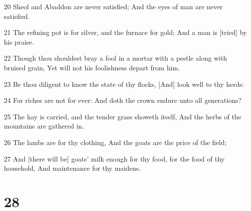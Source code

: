 \par 20 Sheol and Abaddon are never satisfied; And the eyes of man are never satisfied.
\par 21 The refining pot is for silver, and the furnace for gold; And a man is [tried] by his praise.
\par 22 Though thou shouldest bray a fool in a mortar with a pestle along with bruised grain, Yet will not his foolishness depart from him.
\par 23 Be thou diligent to know the state of thy flocks, [And] look well to thy herds:
\par 24 For riches are not for ever: And doth the crown endure unto all generations?
\par 25 The hay is carried, and the tender grass showeth itself, And the herbs of the mountains are gathered in.
\par 26 The lambs are for thy clothing, And the goats are the price of the field;
\par 27 And [there will be] goats' milk enough for thy food, for the food of thy household, And maintenance for thy maidens.

\chapter{28}


